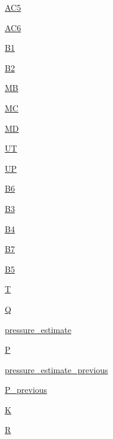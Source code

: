 \begin{DoxyCompactItemize}
\item 
\hyperlink{classbmp183_1_1bmp183_ad88e001d0701dc7cf3a48729eb8150e5}{A\+C5}
\item 
\hyperlink{classbmp183_1_1bmp183_a701bb46a4a32843305e0fd27aabaf43a}{A\+C6}
\item 
\hyperlink{classbmp183_1_1bmp183_a2a42039ccc9ae970620b57b740003753}{B1}
\item 
\hyperlink{classbmp183_1_1bmp183_a888b45737b8318b9d7a15e7a0cef4ce8}{B2}
\item 
\hyperlink{classbmp183_1_1bmp183_afb8d2d137be4de89c83dec10b2c40e80}{MB}
\item 
\hyperlink{classbmp183_1_1bmp183_a8dfa9c55987e86febf9c0b470527c5ae}{MC}
\item 
\hyperlink{classbmp183_1_1bmp183_a02b235142116033fcc0e854d2a2ebed8}{MD}
\item 
\hyperlink{classbmp183_1_1bmp183_a4ad4aeaa8cd60eebc072b8c6e42454b9}{UT}
\item 
\hyperlink{classbmp183_1_1bmp183_a5e0825f49b6206d3c4e201ad08e14ce1}{UP}
\item 
\hyperlink{classbmp183_1_1bmp183_a9c2123df95d8752304b44fade6db4cbe}{B6}
\item 
\hyperlink{classbmp183_1_1bmp183_af82d03ff5a63a36141365fb1d9691e11}{B3}
\item 
\hyperlink{classbmp183_1_1bmp183_aec9db96888f829bf866e9f474d7cd6c3}{B4}
\item 
\hyperlink{classbmp183_1_1bmp183_ae3a6e214efff1d4bfe89bbcbf77d1624}{B7}
\item 
\hyperlink{classbmp183_1_1bmp183_aa058849b3003d9b05e7b74843ce79099}{B5}
\item 
\hyperlink{classbmp183_1_1bmp183_aab882410fdb59bd2da0b167da450dcd0}{T}
\item 
\hyperlink{classbmp183_1_1bmp183_a207931f830d20f4da639ad0c6506ed3a}{Q}
\item 
\hyperlink{classbmp183_1_1bmp183_af45af8b2e2c5a21a54c0f257ec26b05e}{pressure\+\_\+estimate}
\item 
\hyperlink{classbmp183_1_1bmp183_a3ae9e6b9a95f8ec27b99a0f4e67de35b}{P}
\item 
\hyperlink{classbmp183_1_1bmp183_a287856d34cd623db00c2796699eae1cc}{pressure\+\_\+estimate\+\_\+previous}
\item 
\hyperlink{classbmp183_1_1bmp183_acff61d68ac312ea2bef1300aa3fbe0d3}{P\+\_\+previous}
\item 
\hyperlink{classbmp183_1_1bmp183_a50f080ed87360a55dc316b4006576a8b}{K}
\item 
\hyperlink{classbmp183_1_1bmp183_a5d9d15ca620299f6046bce90b78b28ee}{R}
\end{DoxyCompactItemize}
